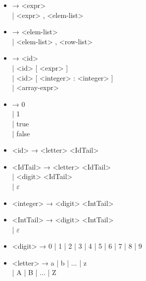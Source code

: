 \documentclass[a4paper,final]{article}
\begin{document}
\begin{itemize}
\begin{itemize}
\item <elem-list>    → <expr> \\| <expr> , <elem-list>
\item <row-list>     → { <elem-list> } \\| { <elem-list> } , <row-list>
\item <len-arg>      → <id> \\| <id> [ <expr> ] \\| <id> [ <integer> : <integer> ] \\| <array-expr>
\item <bool-val>     → 0 \\| 1 \\| true \\| false
\item <id>           → <letter> <IdTail>
\item <IdTail>       → <letter> <IdTail> \\| <digit> <IdTail> \\| \ensuremath{\varepsilon}
\item <integer>      → <digit> <IntTail>
\item <IntTail>      → <digit> <IntTail> \\| \ensuremath{\varepsilon}
\item <digit>        → 0 | 1 | 2 | 3 | 4 | 5 | 6 | 7 | 8 | 9
\item <letter>       → a | b | ... | z \\| A | B | ... | Z
    \end{itemize}
\end{itemize}
\end{document}
